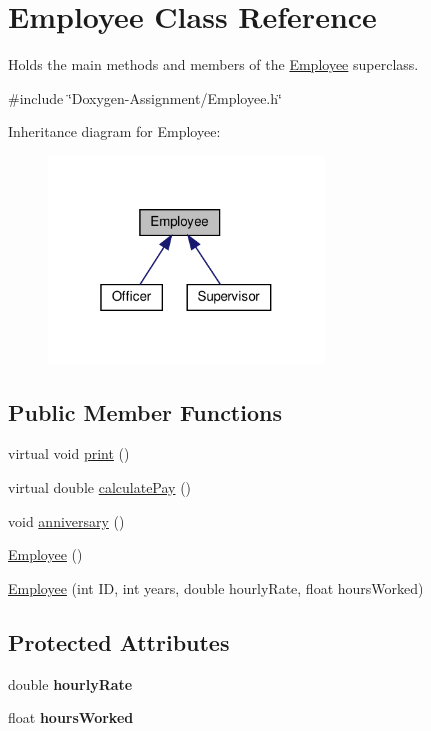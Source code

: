 \hypertarget{classEmployee}{}\section{Employee Class Reference}
\label{classEmployee}


Holds the main methods and members of the \hyperlink{classEmployee}{Employee} superclass.  




{\ttfamily \#include \char`\"{}Doxygen-\/\+Assignment/\+Employee.\+h\char`\"{}}



Inheritance diagram for Employee\+:\nopagebreak
\begin{figure}[H]
\begin{center}
\leavevmode
\includegraphics[width=208pt]{classEmployee__inherit__graph}
\end{center}
\end{figure}
\subsection*{Public Member Functions}
\begin{DoxyCompactItemize}
\item 
virtual void \hyperlink{classEmployee_a79556ad700627dba88049f487a34a762}{print} ()
\item 
virtual double \hyperlink{classEmployee_a01c2c44e15434237db28832f6972e960}{calculate\+Pay} ()
\item 
void \hyperlink{classEmployee_a67c345031cf63f515fb09dc675dee5f3}{anniversary} ()
\item 
\hyperlink{classEmployee_a003c7bd08c40924e381eb0750cbb906f}{Employee} ()
\item 
\hyperlink{classEmployee_ad0c935ef9a290a82dcf7865172c90148}{Employee} (int ID, int years, double hourly\+Rate, float hours\+Worked)
\end{DoxyCompactItemize}
\subsection*{Protected Attributes}
\begin{DoxyCompactItemize}
\item 
\mbox{\label{classEmployee_ac31134abb9b4004fc015e51ef579b069}} 
double {\bfseries hourly\+Rate}
\item 
\mbox{\label{classEmployee_afde35c73d02eb1cfe89e23a80998b42e}} 
float {\bfseries hours\+Worked}
\end{DoxyCompactItemize}
